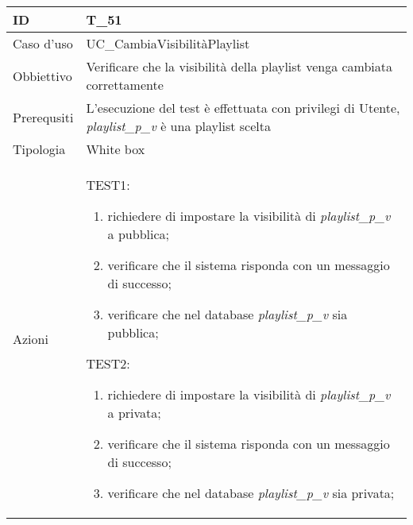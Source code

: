 \begin{table}[hb]
    \centering
    \begin{tabular}{ |p{2cm}|p{10cm}|  }
        \hline
        ID          & T\_51                                                                 \\\hline
        Caso d'uso  & UC\_CambiaVisibilitàPlaylist                                                    \\\hline
        Obbiettivo  & Verificare che la visibilità della playlist venga cambiata correttamente \\\hline
        Prerequsiti & L'esecuzione del test è effettuata con privilegi di Utente, \emph{playlist\_p\_v}
        è una playlist scelta \\\hline
        Tipologia   & White box                                                             \\\hline
        Azioni      &
        TEST1:
        \begin{enumerate}[nosep, topsep=0pt]
            \item richiedere di impostare la visibilità di \emph{playlist\_p\_v} a pubblica;
            \item verificare che il sistema risponda con un messaggio di successo;
            \item verificare che nel database \emph{playlist\_p\_v} sia pubblica;
        \end{enumerate}
        TEST2:
        \begin{enumerate}[nosep, topsep=0pt]
            \item richiedere di impostare la visibilità di \emph{playlist\_p\_v} a privata;
            \item verificare che il sistema risponda con un messaggio di successo;
            \item verificare che nel database \emph{playlist\_p\_v} sia privata;
        \end{enumerate}
        \\\hline
    \end{tabular}
\end{table}

